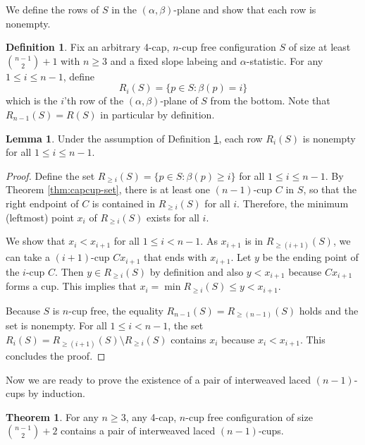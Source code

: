 \documentclass{amsart}
\theoremstyle{definition}
\newtheorem{theorem}[thm]{Theorem}
\newtheorem{lemma}[thm]{Lemma}
\newtheorem{definition}[thm]{Definition}
\numberwithin{thm}{section}
\begin{document}
We define the rows of $S$ in the $(\alpha, \beta)$-plane and show that each row is nonempty.
\begin{definition}
\label{def:rows}
Fix an arbitrary 4-cap, $n$-cup free configuration $S$ of size at least $\binom{n-1}{2} + 1$ with $n \geq 3$ and a fixed slope labeing and $\alpha$-statistic.
For any $1 \leq i \leq n - 1$, define 
$$R_i(S) = \{p \in S : \beta(p) = i\} $$
which is the $i$'th row of the $(\alpha, \beta)$-plane of $S$ from the bottom.
Note that $R_{n-1}(S) = R(S)$ in particular by definition.
\end{definition}
\begin{lemma}
\label{lem:row-nonempty}
Under the assumption of Definition \ref{def:rows}, 
each row $R_i(S)$ is nonempty for all $1 \leq i \leq n - 1$.
\end{lemma}
\begin{proof}
Define the set $R_{\geq i}(S) = \{p \in S : \beta(p) \geq i\}$ for all $1 \leq i \leq n - 1$.
By Theorem \ref{thm:capcup-set}, there is at least one $(n-1)$-cup $C$ in $S$, so that the right endpoint of $C$ is contained in $R_{\geq i}(S)$ for all $i$.
Therefore, the minimum (leftmost) point $x_i$ of $R_{\geq i}(S)$ exists for all $i$. 

We show that $x_i < x_{i+1}$ for all $1 \leq i < n - 1$.
As $x_{i+1}$ is in $R_{\geq(i+1)}(S)$, we can take a
$(i+1)$-cup $Cx_{i+1}$ that ends with $x_{i+1}$.
Let $y$ be the ending point of the $i$-cup $C$. 
Then $y \in R_{\geq i}(S)$ by definition and also $y < x_{i+1}$ because $Cx_{i+1}$ forms a cup.
This implies that $x_i = \min R_{\geq i}(S) \leq y < x_{i+1}$.

Because $S$ is $n$-cup free, the equality $R_{n-1}(S) = R_{\geq (n-1)}(S)$ holds and the set is nonempty.
For all $1 \leq i < n - 1$, the set $R_{i}(S) = R_{\geq (i + 1)}(S) \setminus R_{\geq i}(S)$ contains $x_i$ because $x_i < x_{i+1}$.
This concludes the proof.
\end{proof}

Now we are ready to prove the existence of a pair of interweaved laced $(n-1)$-cups by induction.
\begin{theorem}
\label{thm:main-lemma}
For any $n \geq 3$, any 4-cap, $n$-cup free configuration of size $\binom{n-1}{2}+2$ contains a pair of interweaved laced $(n-1)$-cups.
\end{theorem}
\end{document}
